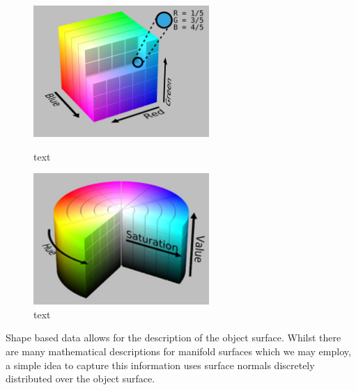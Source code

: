 \documentclass[a4paper]{article}
\begin{document}
\vspace{0.5cm}
 
\begin{figure}[h]
	\centering
	\begin{minipage}{0.45\textwidth}
		\centering
		\includegraphics[height=5cm]{RGB_colour_space}
		\caption{text}
	\end{minipage}
	\hspace{1cm}
	\begin{minipage}{0.45\textwidth}
		\centering
		\includegraphics[height=5cm]{HSV_colour_space}
		\caption{text}
	\end{minipage}
\end{figure}

Shape based data allows for the description of the object surface. Whilst there are many mathematical descriptions for manifold surfaces which we may employ, a simple idea to capture this information uses surface normals discretely distributed over the object surface.
\end{document}
